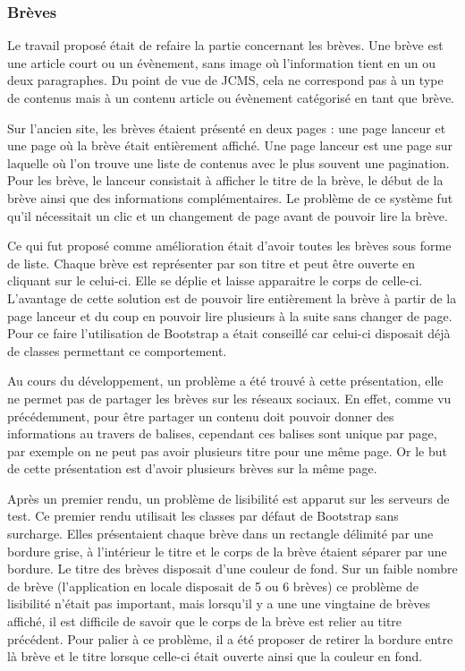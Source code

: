 \documentclass[12pt,a4paper]{article}
\begin{document}
\subsubsection{Brèves}
Le travail proposé était de refaire la partie concernant les brèves. Une brève est une article court ou un évènement, sans image où l'information tient en un ou deux paragraphes. Du point de vue de JCMS, cela ne correspond pas à un type de contenus mais à un contenu article ou évènement catégorisé en tant que brève.\par
Sur l'ancien site, les brèves étaient présenté en deux pages : une page lanceur et une page où la brève était entièrement affiché. Une page lanceur est une page sur laquelle où l'on trouve une liste de contenus avec le plus souvent une pagination. Pour les brève, le lanceur consistait à afficher le titre de la brève, le début de la brève ainsi que des informations complémentaires. Le problème de ce système fut qu'il nécessitait un clic et un changement de page avant de pouvoir lire la brève.\par
Ce qui fut proposé comme amélioration était d'avoir toutes les brèves sous forme de liste. Chaque brève est représenter par son titre et peut être ouverte en cliquant sur le celui-ci. Elle se déplie et laisse apparaitre le corps de celle-ci. L'avantage de cette solution est de pouvoir lire entièrement la brève à partir de la page lanceur et du coup en pouvoir lire plusieurs à la suite sans changer de page. Pour ce faire l'utilisation de Bootstrap a était conseillé car celui-ci disposait déjà de classes permettant ce comportement.\par
Au cours du développement, un problème a été trouvé à cette présentation, elle ne permet pas de partager les brèves sur les réseaux sociaux. En effet, comme vu précédemment, pour être partager un contenu doit pouvoir donner des informations au travers de balises, cependant ces balises sont unique par page, par exemple on ne peut pas avoir plusieurs titre pour une même page. Or le but de cette présentation est d'avoir plusieurs brèves sur la même page.\par
Après un premier rendu, un problème de lisibilité est apparut sur les serveurs de test. Ce premier rendu utilisait les classes par défaut de Bootstrap sans surcharge. Elles présentaient chaque brève dans un rectangle délimité par une bordure grise, à l'intérieur le titre et le corps de la brève étaient séparer par une bordure. Le titre des brèves disposait d'une couleur de fond. Sur un faible nombre de brève (l'application en locale disposait de 5 ou 6 brèves) ce problème de lisibilité n'était pas important, mais lorsqu'il y a une une vingtaine de brèves affiché, il est difficile de savoir que le corps de la brève est relier au titre précédent. Pour palier à ce problème, il a été proposer de retirer la bordure entre là brève et le titre lorsque celle-ci était ouverte ainsi que la couleur en fond.\par
\end{document}
